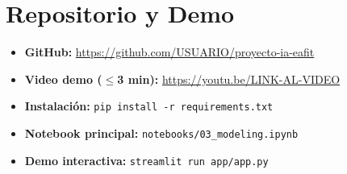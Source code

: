 \documentclass[10pt,twocolumn]{article}
\begin{document}
\section*{Repositorio y Demo}

\begin{itemize}[leftmargin=*,topsep=2pt,itemsep=1pt]
  \item \textbf{GitHub:} \url{https://github.com/USUARIO/proyecto-ia-eafit}
  \item \textbf{Video demo ($\leq$3 min):} \url{https://youtu.be/LINK-AL-VIDEO}
  \item \textbf{Instalación:} \texttt{pip install -r requirements.txt}
  \item \textbf{Notebook principal:} \texttt{notebooks/03\_modeling.ipynb}
  \item \textbf{Demo interactiva:} \texttt{streamlit run app/app.py}
\end{itemize}
\end{document}
